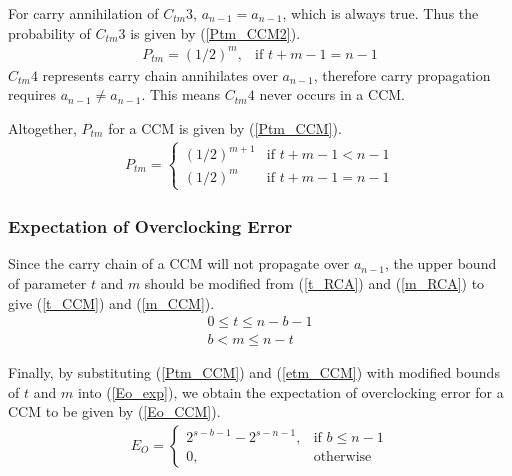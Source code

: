 \documentclass[journal]{IEEEtran}
\begin{document}
For carry annihilation of $C_{tm}3$, $a_{n-1}=a_{n-1}$, which is always true. Thus the probability of $C_{tm}3$ is given by (\ref{Ptm_CCM2}).
%
\begin{eqnarray}\label{Ptm_CCM2}
  P_{tm}=\left(1/2\right)^m, & \textrm{if $t+m-1=n-1$}
\end{eqnarray}
$C_{tm}4$ represents carry chain annihilates over $a_{n-1}$, therefore carry propagation requires $a_{n-1}\neq a_{n-1}$. This means $C_{tm}4$ never occurs in a CCM.

Altogether, $P_{tm}$ for a CCM is given by (\ref{Ptm_CCM}).
\begin{eqnarray}\label{Ptm_CCM}
  P_{tm}=\left\{\begin{array}{ll}
      (1/2)^{m+1} & \textrm{if $t+m-1<n-1$}\\
      (1/2)^{m} & \textrm{if $t+m-1=n-1$}
    \end{array} \right.
\end{eqnarray}

\subsubsection{Expectation of Overclocking Error}
Since the carry chain of a CCM will not propagate over $a_{n-1}$, the upper bound of parameter $t$ and $m$ should be modified from (\ref{t_RCA}) and (\ref{m_RCA}) to give (\ref{t_CCM}) and (\ref{m_CCM}).
%
\begin{eqnarray}
  \label{t_CCM} 0\leqslant t\leqslant n-b-1\\
  \label{m_CCM} b<m\leqslant n-t
\end{eqnarray}

Finally, by substituting (\ref{Ptm_CCM}) and (\ref{etm_CCM}) with modified bounds of $t$ and $m$ into (\ref{Eo_exp}), we obtain the expectation of overclocking error for a CCM to be given by (\ref{Eo_CCM}).
%
\begin{eqnarray}\label{Eo_CCM}
      E_O=\left\{
        \begin{matrix}
            2^{s-b-1}-2^{s-n-1}, & \textrm{if $b\leq n-1$}\\
            0, & \textrm{otherwise}
        \end{matrix}
      \right.
\end{eqnarray}
\end{document}
